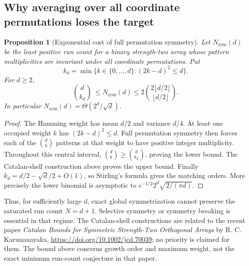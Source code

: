 \documentclass[11pt]{article}
\newtheorem{proposition}{Proposition}[section]
\begin{document}
\subsection{Why averaging over all coordinate permutations loses the target}
\begin{proposition}[Exponential cost of full permutation symmetry]
Let $N_{\mathrm{sym}}(d)$ be the least positive run count for a binary
strength-two array whose pattern multiplicities are invariant under all
coordinate permutations. Put
\[
 k_d=\min\{k\in\{0,\ldots,d\}:(2k-d)^2\le d\}.
\]
For $d\ge2$,
\[
 \binom d{k_d}\ \le N_{\mathrm{sym}}(d)
 \le 2\binom{2\lfloor d/2\rfloor}{\lfloor d/2\rfloor}.
\]
In particular $N_{\mathrm{sym}}(d)=\Theta(2^d/\sqrt d)$.
\end{proposition}
\begin{proof}
The Hamming weight has mean $d/2$ and variance $d/4$. At least one
occupied weight $k$ has $(2k-d)^2\le d$. Full permutation symmetry
then forces each of the $\binom dk$ patterns at that weight to have
positive integer multiplicity. Throughout this central interval,
$\binom dk\ge\binom d{k_d}$, proving the lower bound. The Catalan-shell
construction above proves the upper bound. Finally
$k_d=d/2-\sqrt d/2+O(1)$, so Stirling's formula gives the matching
orders. More precisely the lower binomial is asymptotic to
$e^{-1/2}2^d\sqrt{2/(\pi d)}$.
\end{proof}
Thus, for sufficiently large $d$, exact global symmetrization cannot
preserve the saturated run count $N=d+1$. Selective symmetry or symmetry
breaking is essential in that regime. The
Catalan-shell constructions are related to the recent paper
\emph{Catalan Bounds for Symmetric Strength-Two Orthogonal Arrays}
by R. C. Karunanayaka,
\url{https://doi.org/10.1002/jcd.70039}; no priority is claimed for them.
The bound above concerns growth order and maximum weight, not the exact
minimum run-count conjecture in that paper.
\end{document}
